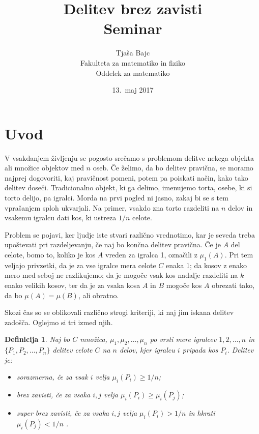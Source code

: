 \documentclass[a4paper,12pt]{article}
\title{Delitev brez zavisti \\ 
\Large Seminar}
\author{Tjaša Bajc \\
Fakulteta za matematiko in fiziko \\
Oddelek za matematiko}
\date{13.\ maj 2017}
\newtheorem{definicija}{Definicija}
\begin{document}


\maketitle



\section{Uvod}

V vsakdanjem življenju se pogosto srečamo s problemom delitve nekega objekta ali množice objektov med $n$ oseb. Če želimo, da bo delitev pravična, se moramo najprej dogovoriti, kaj pravičnost pomeni, potem pa poiskati način, kako tako delitev doseči. Tradicionalno objekt, ki ga delimo, imenujemo torta, osebe, ki si torto delijo, pa igralci. %
Morda na prvi pogled ni jasno, zakaj bi se s tem vprašanjem sploh ukvarjali. Na primer, vsakdo zna torto razdeliti na $n$ delov in vsakemu igralcu dati kos, ki ustreza $1/n$ celote. 

Problem se pojavi, ker ljudje iste stvari različno vrednotimo, kar je seveda treba upoštevati pri razdeljevanju, če naj bo končna delitev pravična. Če je $A$ del celote, bomo to, koliko je kos $A$ vreden za igralca 1, označili z $\mu_1(A)$. Pri tem veljajo privzetki, da je za vse igralce mera celote $C$ enaka 1; %
da kosov z enako mero med seboj ne razlikujemo; da je mogoče vsak kos nadalje razdeliti na $k$ enako velikih kosov, ter da je za vsaka kosa $A$ in $B$ mogoče kos $A$ obrezati tako, da bo $\mu(A) = \mu(B)$, ali obratno.


Skozi čas so se oblikovali različno strogi kriteriji, ki naj jim iskana delitev zadošča. Oglejmo si tri izmed njih.

\begin{definicija}
Naj bo $C$ množica, $\mu_1, \mu_2, \ldots, \mu_n$ po vrsti mere igralcev $1, 2, \ldots, n$ in $\{P_1, P_2, \ldots, P_n\}$ delitev celote $C$ na $n$ delov, kjer igralcu $i$ pripada kos $P_i$. Delitev je:

\begin{itemize}[noitemsep]
\item {\em sorazmerna\/}, če za vsak $i$ velja $\mu_i(P_i) \geq 1/n$;
\item {\em brez zavisti\/}, če za vsaka $i, j$ velja $\mu_i(P_i) \geq \mu_i(P_j)$;
\item{\em super brez zavisti\/}, če za vsaka $i, j$ velja $\mu_i(P_i) > 1/n$ in hkrati $\mu_i(P_j) < 1/n$ .								
\end{itemize}

\end{definicija}
\end{document}
